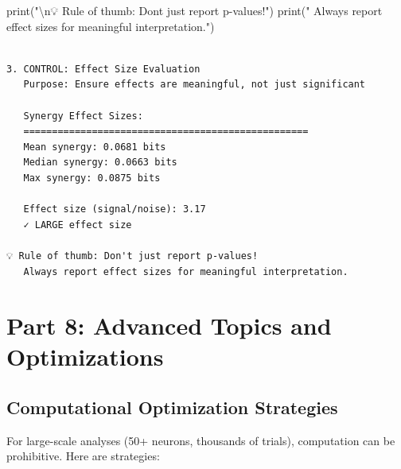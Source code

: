 \documentclass[
  11pt,
  letterpaper,
  oneside,
  openany]{book}
\newenvironment{Shaded}{\begin{snugshade}}{\end{snugshade}}
\newcommand{\BuiltInTok}[1]{\textcolor[rgb]{0.00,0.23,0.31}{#1}}
\newcommand{\CharTok}[1]{\textcolor[rgb]{0.13,0.47,0.30}{#1}}
\newcommand{\NormalTok}[1]{\textcolor[rgb]{0.00,0.23,0.31}{#1}}
\newcommand{\StringTok}[1]{\textcolor[rgb]{0.13,0.47,0.30}{#1}}
\begin{document}
\begin{Shaded}
\begin{Highlighting}[]
\BuiltInTok{print}\NormalTok{(}\StringTok{"}\CharTok{\textbackslash{}n}\StringTok{💡 Rule of thumb: Don\textquotesingle{}t just report p{-}values!"}\NormalTok{)}
\BuiltInTok{print}\NormalTok{(}\StringTok{"   Always report effect sizes for meaningful interpretation."}\NormalTok{)}
\end{Highlighting}
\end{Shaded}

\begin{verbatim}

3. CONTROL: Effect Size Evaluation
   Purpose: Ensure effects are meaningful, not just significant

   Synergy Effect Sizes:
   ==================================================
   Mean synergy: 0.0681 bits
   Median synergy: 0.0663 bits
   Max synergy: 0.0875 bits

   Effect size (signal/noise): 3.17
   ✓ LARGE effect size

💡 Rule of thumb: Don't just report p-values!
   Always report effect sizes for meaningful interpretation.
\end{verbatim}

\section{Part 8: Advanced Topics and
Optimizations}\label{part-8-advanced-topics-and-optimizations}

\subsection{Computational Optimization
Strategies}\label{computational-optimization-strategies}

For large-scale analyses (50+ neurons, thousands of trials), computation
can be prohibitive. Here are strategies:
\end{document}
